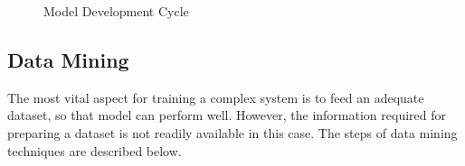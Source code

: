 \begin{figure}[htp]
    \begin{center} 
    \usetikzlibrary{decorations.text} 
    \newcommand*{\mytextstyle}{\sffamily\Large\bfseries\color{black!85}} 
    \newcommand{\arcarrow}[8]{%
      \pgfmathsetmacro{\rin}{#1} 
      \pgfmathsetmacro{\rmid}{#2} 
      \pgfmathsetmacro{\rout}{#3} 
      \pgfmathsetmacro{\astart}{#4} 
      \pgfmathsetmacro{\aend}{#5} 
      \pgfmathsetmacro{\atip}{#6} 
      \fill[#7] (\astart+\atip:\rin) arc (\astart+\atip:\aend:\rin) 
           -- (\aend-\atip:\rmid) 
           -- (\aend:\rout) arc (\aend:\astart+\atip:\rout) 
           -- (\astart:\rmid) -- cycle; 
      \path[font = \sffamily, decoration = {text along path, text = {|\mytextstyle|#8}, 
        text align = {align = center}, raise = -.8ex}, decorate] 
        (\astart+\atip:\rmid) arc (\astart+\atip:\aend+\atip:\rmid); 
    } 
    

     \end{center} 
    \caption{Model Development Cycle}
    \label{fig:design}
\end{figure}

\subsection{Data Mining}
The most vital aspect for training a complex system is to feed an adequate dataset, so that model can perform well. However, the information required for preparing a dataset is not readily available in this case.  The steps of data mining techniques are described below. 


